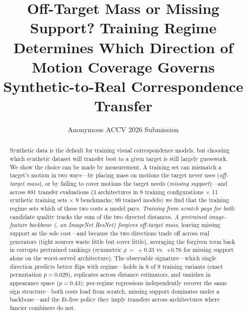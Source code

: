 \documentclass[runningheads]{llncs}
\begin{document}
\title{Off-Target Mass or Missing Support? Training Regime Determines Which
Direction of Motion Coverage Governs Synthetic-to-Real Correspondence Transfer}

\author{Anonymous ACCV 2026 Submission}

\maketitle

\begin{abstract}
Synthetic data is the default for training visual correspondence models, but
choosing which synthetic dataset will transfer best to a given target is still
largely guesswork. We show the choice can be made by measurement. A training
set can mismatch a target's motion in two ways---by placing mass on motions
the target never uses (\emph{off-target mass}), or by failing to cover
motions the target needs (\emph{missing support})---and across 891 transfer
evaluations (3 architectures in 9 training configurations $\times$ 11
synthetic training sets $\times$ 9 benchmarks; 99 trained models) we find
that the training regime sets which of these two costs a model pays. \emph{Training from scratch pays for both}: candidate
quality tracks the sum of the two directed distances. \emph{A pretrained
image-feature backbone (\eg, an ImageNet ResNet) forgives off-target mass},
leaving missing support as the sole cost---and because the two directions
trade off across real generators (tight sources waste little but cover
little), averaging the forgiven term back in corrupts pretrained rankings
(symmetric $\rho\,{=}\,{+}0.33$ vs.\ ${+}0.76$ for missing support alone on
the worst-served architecture). The observable signature---which single
direction predicts better flips with regime---holds in 8 of 9 training
variants (exact permutation $p{=}0.029$), replicates across distance
estimators, and vanishes in appearance space ($p{=}0.43$); per-regime
regressions independently recover the same sign structure---both costs
load from scratch, missing support dominates under a backbone---and the
fit-free policy they imply transfers across architectures where fancier
combiners do not.


\end{abstract}
\end{document}

